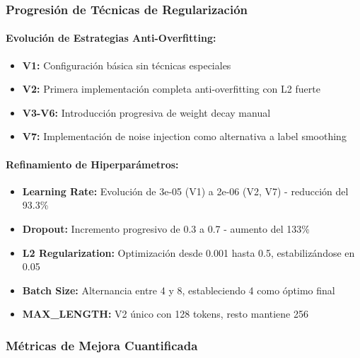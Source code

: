 \subsubsection{Progresión de Técnicas de Regularización}

\paragraph{Evolución de Estrategias Anti-Overfitting:}
\begin{itemize}
    \item \textbf{V1:} Configuración básica sin técnicas especiales
    \item \textbf{V2:} Primera implementación completa anti-overfitting con L2 fuerte
    \item \textbf{V3-V6:} Introducción progresiva de weight decay manual
    \item \textbf{V7:} Implementación de noise injection como alternativa a label smoothing
\end{itemize}

\paragraph{Refinamiento de Hiperparámetros:}
\begin{itemize}
    \item \textbf{Learning Rate:} Evolución de 3e-05 (V1) a 2e-06 (V2, V7) - reducción del 93.3\%
    \item \textbf{Dropout:} Incremento progresivo de 0.3 a 0.7 - aumento del 133\%
    \item \textbf{L2 Regularization:} Optimización desde 0.001 hasta 0.5, estabilizándose en 0.05
    \item \textbf{Batch Size:} Alternancia entre 4 y 8, estableciendo 4 como óptimo final
    \item \textbf{MAX\_LENGTH:} V2 único con 128 tokens, resto mantiene 256
\end{itemize}

\subsubsection{Métricas de Mejora Cuantificada}

